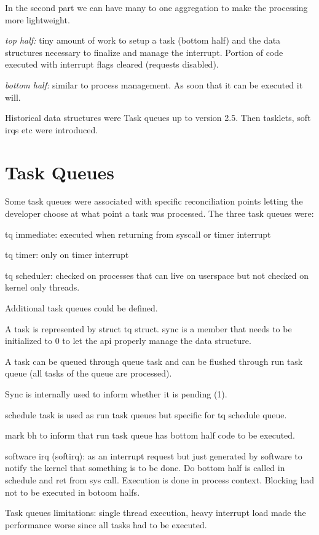 \documentclass[twoside]{article}
\begin{document}
In the second part we can have many to one aggregation to make the processing
more lightweight.

\textit{top half:} tiny amount of work to setup a task (bottom half) and the
data structures necessary to finalize and manage the interrupt.
Portion of code executed with interrupt flags cleared (requests disabled).

\textit{bottom half:} similar to process management. As soon that it can be
executed it will. 

Historical data structures were Task queues up to version 2.5. Then tasklets,
soft irqs etc were introduced.

\section{Task Queues}
\label{sec:Task Queues}

Some task queues were associated with specific reconciliation points letting the
developer choose at what point a task was processed. The three task queues were:

tq immediate: executed when returning from syscall or timer interrupt

tq timer: only on timer interrupt

tq scheduler: checked on processes that can live on userspace but not checked on
kernel only threads.

Additional task queues could be defined.

A task is represented by struct tq struct. sync is a member that needs to be
initialized to 0 to let the api properly manage the data structure.

A task can be queued through queue task and can be flushed through run task
queue (all tasks of the queue are processed).

Sync is internally used to inform whether it is pending (1).

schedule task is used as run task queues but specific for tq schedule queue.

mark bh to inform that run task queue has bottom half code to be executed.

software irq (softirq): as an interrupt request but just generated by software
to notify the kernel that something is to be done. Do bottom half is called in
schedule and ret from sys call. Execution is done in process context. Blocking
had not to be executed in botoom halfs.

Task queues limitations: single thread execution, heavy interrupt load made the
performance worse since all tasks had to be executed.
\end{document}
